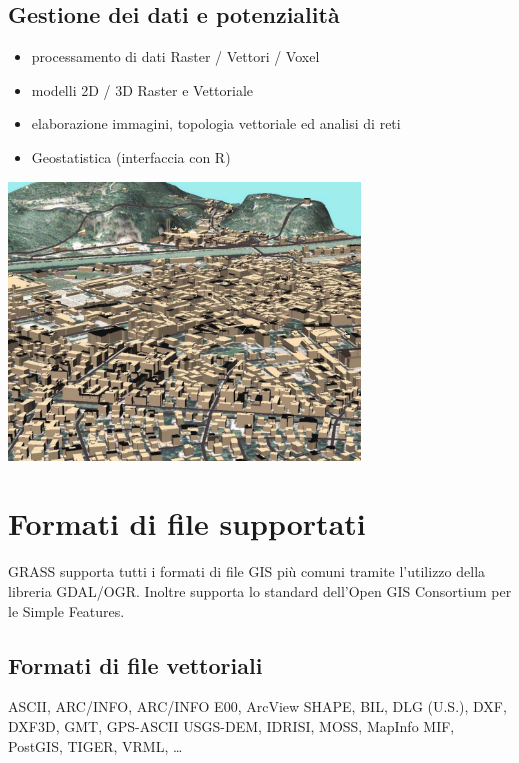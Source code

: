 \documentclass[notumble,a4paper,10pt,nofoldmark]{leaflet}
\newenvironment{myfig}[1][0pt plus 1.5ex minus .5ex]{\par\vspace*{#1}\begin{minipage}{\textwidth}\centering}{\end{minipage}}
\begin{document}
\subsection{Gestione dei dati e potenzialit\`a}

\begin{itemize}
\item processamento di dati Raster / Vettori / Voxel
\item modelli 2D / 3D Raster e Vettoriale 
\item elaborazione immagini, topologia vettoriale ed analisi di reti
\item Geostatistica (interfaccia con R)
\end{itemize}

\begin{myfig}[1ex]
\includegraphics[width=0.7\textwidth]{trento3d}
\end{myfig}

\section{Formati di file supportati}

GRASS supporta tutti i formati di file GIS pi\`u comuni tramite l'utilizzo della libreria GDAL/OGR. Inoltre  supporta lo standard dell'Open GIS Consortium per le Simple Features.

\subsection{Formati di file vettoriali}
ASCII, ARC/INFO, ARC/INFO E00, Arc\-View SHAPE, BIL, DLG (U.S.), DXF, DXF3D, GMT, GPS-ASCII USGS-DEM, IDRISI, MOSS, MapInfo MIF, PostGIS, TIGER, VRML, \dots
\end{document}
